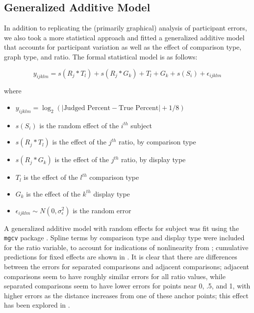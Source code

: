 \documentclass[letterpaper,inpress,dvipsnames]{jdsart}
\begin{document}
\hypertarget{generalized-additive-model}{%
\subsection{Generalized Additive Model}\label{generalized-additive-model}}

In addition to replicating the (primarily graphical) analysis of participant errors, we also took a more statistical approach and fitted a generalized additive model that accounts for participant variation as well as the effect of comparison type, graph type, and ratio. The formal statistical model is as follows:

\[y_{ijklm}= s(R_j * T_l) + s(R_j *G_k) + T_l + G_k + s(S_i) + \epsilon_{ijklm}\]

\noindent where

\begin{itemize}
\item
  \(y_{ijklm}=\log_2(|\text{Judged Percent} - \text{True Percent}|+1/8)\)
\item
  \(s(S_i)\) is the random effect of the \(i^{th}\) subject
\item
  \(s(R_j*T_l)\) is the effect of the \(j^{th}\) ratio, by comparison type
\item
  \(s(R_j*G_k)\) is the effect of the \(j^{th}\) ratio, by display type
\item
  \(T_l\) is the effect of the \(l^{th}\) comparison type
\item
  \(G_k\) is the effect of the \(k^{th}\) display type
\item
  \(\epsilon_{ijklm}\sim N(0,\sigma^2_\epsilon)\) is the random error
\end{itemize}

A generalized additive model with random effects for subject was fit using the \texttt{mgcv} package \citep{mgcv1, mgcv2, mgcv3}. Spline terms by comparison type and display type were included for the ratio variable, to account for indications of nonlinearity from ; cumulative predictions for fixed effects are shown in . It is clear that there are differences between the errors for separated comparisons and adjacent comparisons; adjacent comparisons seem to have roughly similar errors for all ratio values, while separated comparisons seem to have lower errors for points near 0, .5, and 1, with higher errors as the distance increases from one of these anchor points; this effect has been explored in \citet{hollandsBiasProportionJudgments2000}.
\end{document}
